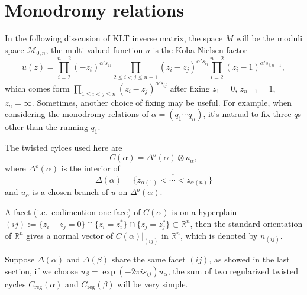 \documentclass[11pt]{article}
\theoremstyle{definition}
\theoremstyle{plain}
\begin{document}



\section{Monodromy relations}

In the following disscusion of KLT inverse matrix, the space 
$M$ will be the moduli space $\mathcal M_{0,n}$, the multi-valued
function $u$ is the Koba-Nielsen factor
\[
	u(z)=\prod_{i=2}^{n-2}(-z_i)^{\alpha' s_{1i}}\prod_{2\leq i<j\leq n-1}(z_i-z_j)^{\alpha' s_{ij}}\prod_{i=2}^{n-2}(z_i-1)^{\alpha' s_{i,n-1}},
\]
which comes form $\prod_{1\leq i<j \leq n}(z_i-z_j)^{\alpha' s_{ij}}$ after
fixing $z_1=0$, $z_{n-1}=1$, $z_n=\infty$. Sometimes, another
choice of fixing may be useful. For example, when considering
the monodromy relations of $\alpha=(q_1\cdots q_n)$, it's natrual
to fix three $q$s other than the running $q_1$.

The twisted cylces used here are
\[
	C(\alpha)=\Delta^o(\alpha)\otimes u_\alpha,
\]
where $\Delta^o(\alpha)$ is the interior of 
\[
	\Delta(\alpha)=\overline{\{z_{\alpha(1)}<\cdots< z_{\alpha(n)}\}}
\]
and $u_\alpha$ is a chosen branch of $u$ on $\Delta^o(\alpha)$. 

A facet (i.e.~codimention one face) of $C(\alpha)$ is on a hyperplain 
$(ij):=\{z_i-z_j=0\}\cap \{z_i=z_i^*\} \cap \{z_j=z_j^*\}
\subset \mathbb R^n$, 
then the standard orientation of $\mathbb R^n$ gives a normal 
vector of $C(\alpha)|_{(ij)}$ in $\mathbb R^n$, which is denoted by $n_{(ij)}$. 

Suppose $\Delta(\alpha)$ and $\Delta(\beta)$ share the same 
facet $(ij)$, 
as showed in the last section, if we choose 
$u_\beta=\exp(-2\pi i s_{ij})u_\alpha$, the sum of two 
regularized twisted cycles $C_{\text{reg}}(\alpha)$ and 
$C_{\text{reg}}(\beta)$ will be very simple. 
\end{document}
